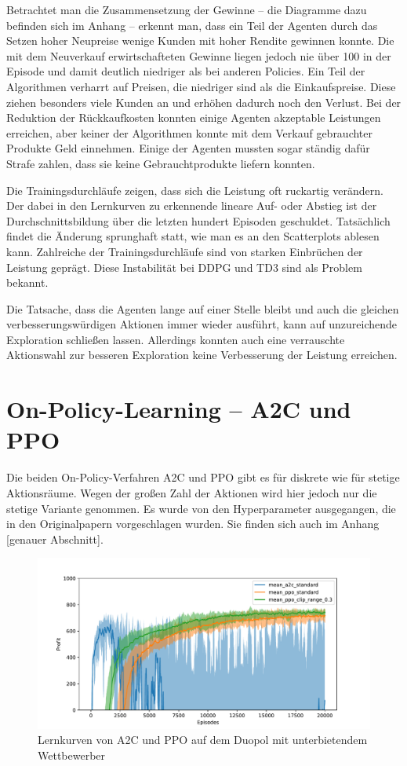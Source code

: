 Betrachtet man die Zusammensetzung der Gewinne -- die Diagramme dazu befinden sich im Anhang -- erkennt man, dass ein Teil der Agenten durch das Setzen hoher Neupreise wenige Kunden mit hoher Rendite gewinnen konnte.
Die mit dem Neuverkauf erwirtschafteten Gewinne liegen jedoch nie über 100 in der Episode und damit deutlich niedriger als bei anderen Policies.
Ein Teil der Algorithmen verharrt auf Preisen, die niedriger sind als die Einkaufspreise.
Diese ziehen besonders viele Kunden an und erhöhen dadurch noch den Verlust.
Bei der Reduktion der Rückkaufkosten konnten einige Agenten akzeptable Leistungen erreichen, aber keiner der Algorithmen konnte mit dem Verkauf gebrauchter Produkte Geld einnehmen.
Einige der Agenten mussten sogar ständig dafür Strafe zahlen, dass sie keine Gebrauchtprodukte liefern konnten.

Die Trainingsdurchläufe zeigen, dass sich die Leistung oft ruckartig verändern.
Der dabei in den Lernkurven zu erkennende lineare Auf- oder Abstieg ist der Durchschnittsbildung über die letzten hundert Episoden geschuldet.
Tatsächlich findet die Änderung sprunghaft statt, wie man es an den Scatterplots ablesen kann.
Zahlreiche der Trainingsdurchläufe sind von starken Einbrüchen der Leistung geprägt.
Diese Instabilität bei DDPG und TD3 sind als Problem bekannt.

Die Tatsache, dass die Agenten lange auf einer Stelle bleibt und auch die gleichen verbesserungswürdigen Aktionen immer wieder ausführt, kann auf unzureichende Exploration schließen lassen.
Allerdings konnten auch eine verrauschte Aktionswahl zur besseren Exploration keine Verbesserung der Leistung erreichen.

\section{On-Policy-Learning -- A2C und PPO}
\label{section:main_ppo}
Die beiden On-Policy-Verfahren A2C und PPO gibt es für diskrete wie für stetige Aktionsräume.
Wegen der großen Zahl der Aktionen wird hier jedoch nur die stetige Variante genommen.
Es wurde von den Hyperparameter ausgegangen, die in den Originalpapern vorgeschlagen wurden.
Sie finden sich auch im Anhang [genauer Abschnitt].

\begin{figure}[htbp]
	\centering
	\includegraphics[width=\textwidth]{main/a2c_vs_ppo.pdf}
	\caption{Lernkurven von A2C und PPO auf dem Duopol mit unterbietendem Wettbewerber}
	\label{grafic:OnPolicyLearningCurves}
\end{figure}

